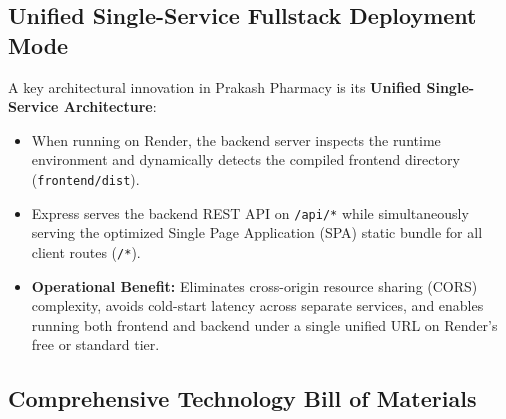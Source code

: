 \documentclass[10pt,a4paper]{article}
\begin{document}
\subsection{Unified Single-Service Fullstack Deployment Mode}
A key architectural innovation in Prakash Pharmacy is its \textbf{Unified Single-Service Architecture}:
\begin{itemize}
    \item When running on Render, the backend server inspects the runtime environment and dynamically detects the compiled frontend directory (\texttt{frontend/dist}).
    \item Express serves the backend REST API on \texttt{/api/*} while simultaneously serving the optimized Single Page Application (SPA) static bundle for all client routes (\texttt{/*}).
    \item \textbf{Operational Benefit:} Eliminates cross-origin resource sharing (CORS) complexity, avoids cold-start latency across separate services, and enables running both frontend and backend under a single unified URL on Render's free or standard tier.
\end{itemize}

\subsection{Comprehensive Technology Bill of Materials}
\end{document}
